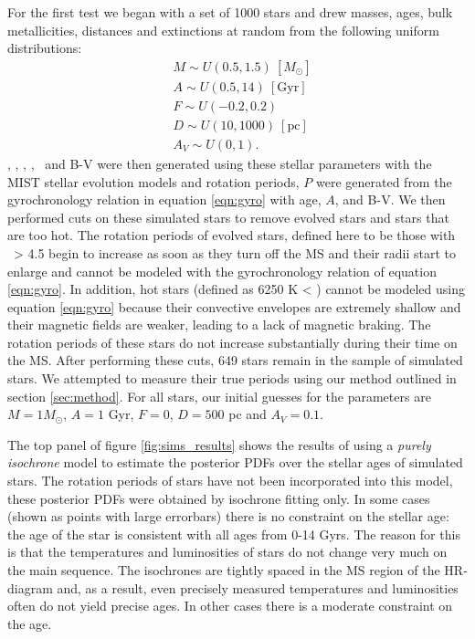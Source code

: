 For the first test we began with a set of 1000 stars and drew masses, ages,
bulk metallicities, distances and extinctions at random from the following
uniform distributions:
\begin{eqnarray}
& M \sim U(0.5, 1.5)~[M_\odot] \\
& A \sim U(0.5, 14)\mathrm{~[Gyr]} \\
& F \sim U(-0.2, 0.2) \\
& D \sim U(10, 1000)~\mathrm{[pc]} \\
& A_V \sim U(0, 1).
\end{eqnarray}
\teff, \logg, \fhat, {\bf \mx}, \pmega\ and B-V were then generated using
these stellar parameters with the MIST stellar evolution models \citep{choi}
and rotation periods, $P$ were generated from the gyrochronology relation in
equation \ref{eqn:gyro} with age, $A$, and B-V.
We then performed cuts on these simulated stars to remove evolved stars and
stars that are too hot.
The rotation periods of evolved stars, defined here to be those with \logg\ >
4.5 begin to increase as soon as they turn off the MS and their radii start to
enlarge and cannot be modeled with the gyrochronology relation of equation
\ref{eqn:gyro}.
In addition, hot stars (defined as 6250 K < \teff) cannot be modeled using
equation \ref{eqn:gyro} because their convective envelopes are extremely
shallow and their magnetic fields are weaker, leading to a lack of magnetic
braking.
The rotation periods of these stars do not increase substantially during their
time on the MS.
After performing these cuts, 649  stars remain in the sample
of simulated stars.
We attempted to measure their true periods using our method outlined in
section \ref{sec:method}.
For all stars, our initial guesses for the parameters are $M = 1M_\odot$, $A =
1$ Gyr, $F = 0$, $D = 500$ pc and $A_V = 0.1$.

The top panel of figure \ref{fig:sims_results} shows the results of using a
{\it purely isochrone} model to estimate the posterior PDFs over the
stellar ages of simulated stars.
The rotation periods of stars have not been incorporated into this model,
these posterior PDFs were obtained by isochrone fitting only.
In some cases (shown as points with large errorbars) there is no constraint on
the stellar age: the age of the star is consistent with all ages from 0-14
Gyrs.
The reason for this is that the temperatures and luminosities of stars do not
change very much on the main sequence.
The isochrones are tightly spaced in the MS region of the HR-diagram and, as a
result, even precisely measured temperatures and luminosities often do not
yield precise ages.
In other cases there is a moderate constraint on the age.

